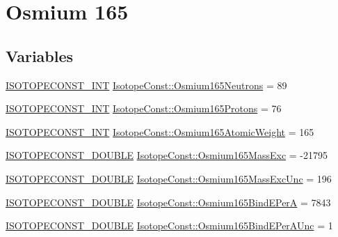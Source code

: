 \hypertarget{group___isotope_const-_osmium-_os165}{}\section{Osmium 165}
\label{group___isotope_const-_osmium-_os165}
\subsection*{Variables}
\begin{DoxyCompactItemize}
\item 
\mbox{\hyperlink{group___isotope_const-_macros_ga5f18360b3e99483a35c32d789e62621c}{I\+S\+O\+T\+O\+P\+E\+C\+O\+N\+S\+T\+\_\+\+I\+NT}} \mbox{\hyperlink{group___isotope_const-_osmium-_os165_gacee42559e9e31d7258de50961d0b44ff}{Isotope\+Const\+::\+Osmium165\+Neutrons}} = 89
\item 
\mbox{\hyperlink{group___isotope_const-_macros_ga5f18360b3e99483a35c32d789e62621c}{I\+S\+O\+T\+O\+P\+E\+C\+O\+N\+S\+T\+\_\+\+I\+NT}} \mbox{\hyperlink{group___isotope_const-_osmium-_os165_ga3e531e0fee0bd0d4e580af93b2f776e2}{Isotope\+Const\+::\+Osmium165\+Protons}} = 76
\item 
\mbox{\hyperlink{group___isotope_const-_macros_ga5f18360b3e99483a35c32d789e62621c}{I\+S\+O\+T\+O\+P\+E\+C\+O\+N\+S\+T\+\_\+\+I\+NT}} \mbox{\hyperlink{group___isotope_const-_osmium-_os165_ga6f512a9b27723401eea27ca3e8325a6c}{Isotope\+Const\+::\+Osmium165\+Atomic\+Weight}} = 165
\item 
\mbox{\hyperlink{group___isotope_const-_macros_ga8f45a7272ce02c0b4c65c44636ed719a}{I\+S\+O\+T\+O\+P\+E\+C\+O\+N\+S\+T\+\_\+\+D\+O\+U\+B\+LE}} \mbox{\hyperlink{group___isotope_const-_osmium-_os165_gaf95b7337896f76e86deba2ab30db945a}{Isotope\+Const\+::\+Osmium165\+Mass\+Exc}} = -\/21795
\item 
\mbox{\hyperlink{group___isotope_const-_macros_ga8f45a7272ce02c0b4c65c44636ed719a}{I\+S\+O\+T\+O\+P\+E\+C\+O\+N\+S\+T\+\_\+\+D\+O\+U\+B\+LE}} \mbox{\hyperlink{group___isotope_const-_osmium-_os165_gad191f765634e6bf71adc181cbbb7ede2}{Isotope\+Const\+::\+Osmium165\+Mass\+Exc\+Unc}} = 196
\item 
\mbox{\hyperlink{group___isotope_const-_macros_ga8f45a7272ce02c0b4c65c44636ed719a}{I\+S\+O\+T\+O\+P\+E\+C\+O\+N\+S\+T\+\_\+\+D\+O\+U\+B\+LE}} \mbox{\hyperlink{group___isotope_const-_osmium-_os165_ga02c5987b68c1944e71b4634d571e3bfb}{Isotope\+Const\+::\+Osmium165\+Bind\+E\+PerA}} = 7843
\item 
\mbox{\hyperlink{group___isotope_const-_macros_ga8f45a7272ce02c0b4c65c44636ed719a}{I\+S\+O\+T\+O\+P\+E\+C\+O\+N\+S\+T\+\_\+\+D\+O\+U\+B\+LE}} \mbox{\hyperlink{group___isotope_const-_osmium-_os165_ga154545baf80273fe0f7cec7355a7c884}{Isotope\+Const\+::\+Osmium165\+Bind\+E\+Per\+A\+Unc}} = 1

\end{DoxyCompactItemize}
